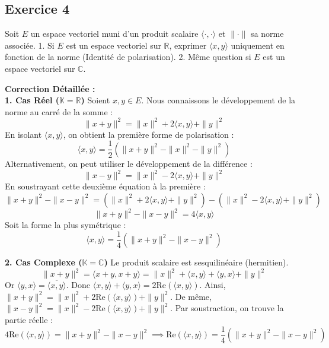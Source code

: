 \documentclass[11pt,a4paper]{report}
\begin{document}
\subsection*{Exercice 4}

Soit $E$ un espace vectoriel muni d'un produit scalaire $\langle \cdot, \cdot \rangle$ et $\| \cdot \|$ sa norme associée.
1. Si $E$ est un espace vectoriel sur $\mathbb{R}$, exprimer $\langle x, y \rangle$ uniquement en fonction de la norme (Identité de polarisation).
2. Même question si $E$ est un espace vectoriel sur $\mathbb{C}$.

\textbf{Correction Détaillée :}\\ \textbf{1. Cas Réel ($\mathbb{K} = \mathbb{R}$)}
Soient $x, y \in E$. Nous connaissons le développement de la norme au carré de la somme :
$$\|x + y\|^2 = \|x\|^2 + 2\langle x, y \rangle + \|y\|^2$$
En isolant $\langle x, y \rangle$, on obtient la première forme de polarisation :
$$\langle x, y \rangle = \frac{1}{2} \left( \|x + y\|^2 - \|x\|^2 - \|y\|^2 \right)$$
Alternativement, on peut utiliser le développement de la différence :
$$\|x - y\|^2 = \|x\|^2 - 2\langle x, y \rangle + \|y\|^2$$
En soustrayant cette deuxième équation à la première :
$$\|x + y\|^2 - \|x - y\|^2 = (\|x\|^2 + 2\langle x, y \rangle + \|y\|^2) - (\|x\|^2 - 2\langle x, y \rangle + \|y\|^2)$$
$$\|x + y\|^2 - \|x - y\|^2 = 4\langle x, y \rangle$$
Soit la forme la plus symétrique :
$$\langle x, y \rangle = \frac{1}{4} \left( \|x + y\|^2 - \|x - y\|^2 \right)$$

\textbf{2. Cas Complexe ($\mathbb{K} = \mathbb{C}$)}
Le produit scalaire est sesquilinéaire (hermitien).
$$\|x + y\|^2 = \langle x+y, x+y \rangle = \|x\|^2 + \langle x, y \rangle + \langle y, x \rangle + \|y\|^2$$
Or $\langle y, x \rangle = \overline{\langle x, y \rangle}$. Donc $\langle x, y \rangle + \langle y, x \rangle = 2 \text{Re}(\langle x, y \rangle)$.
Ainsi, $\|x + y\|^2 = \|x\|^2 + 2\text{Re}(\langle x, y \rangle) + \|y\|^2$.
De même, $\|x - y\|^2 = \|x\|^2 - 2\text{Re}(\langle x, y \rangle) + \|y\|^2$.
Par soustraction, on trouve la partie réelle :
$$4\text{Re}(\langle x, y \rangle) = \|x + y\|^2 - \|x - y\|^2 \implies \text{Re}(\langle x, y \rangle) = \frac{1}{4} (\|x + y\|^2 - \|x - y\|^2)$$
\end{document}
